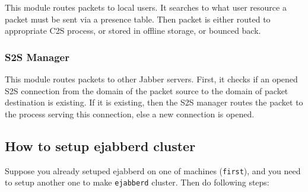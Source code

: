 \documentclass[a4paper,10pt]{article}
\newcommand{\term}[1]{\texttt{#1}}
\newcommand{\ejabberd}{\texttt{ejabberd}}
\newcommand{\Jabber}{Jabber}
\begin{document}
This module routes packets to local users.  It searches to what user
resource a packet must be sent via a presence table.  Then packet is
either routed to appropriate C2S process, or stored in offline
storage, or bounced back.


\subsubsection{S2S Manager}

This module routes packets to other \Jabber{} servers.  First, it
checks if an opened S2S connection from the domain of the packet
source to the domain of packet destination is existing.  If it is
existing, then the S2S manager routes the packet to the process
serving this connection, else a new connection is opened.


\subsection{How to setup ejabberd cluster}
\label{sec:cluster}

Suppose you already setuped ejabberd on one of machines (\term{first}), and
you need to setup another one to make \ejabberd{} cluster.  Then do
following steps:
\end{document}
